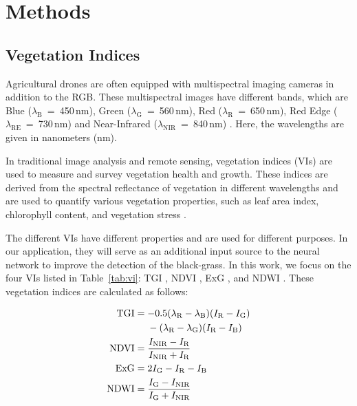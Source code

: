 \documentclass{ieeeaccess}
\begin{document}
\section{Methods}




\subsection{Vegetation Indices}\label{seq:VI}

Agricultural drones are often equipped with multispectral imaging cameras in addition to the RGB. These multispectral images have different bands, which are Blue ($\lambda_\text{B}$~=~450\,nm), Green ($\lambda_\text{G}$~=~560\,nm), Red ($\lambda_\text{R}$~=~650\,nm), Red Edge ($\lambda_\text{RE}$~=~730\,nm) and Near-Infrared ($\lambda_\text{NIR}$~=~840\,nm) \cite{von2015deploying}. Here, the wavelengths are given in nanometers (nm).

In traditional image analysis and remote sensing, vegetation indices (VIs) are used to measure and survey vegetation health and growth. These indices are derived from the spectral reflectance of vegetation in different wavelengths and are used to quantify various vegetation properties, such as leaf area index, chlorophyll content, and vegetation stress \cite{fang2008leaf}. 

The different VIs have different properties and are used for different purposes. In our application, they will serve as an additional input source to the neural network to improve the detection of the black-grass. In this work, we focus on the four VIs listed in Table~\ref{tab:vi}: TGI \cite{hunt2011remote}, NDVI \cite{pettorelli2013}, ExG \cite{woebbecke1995color}, and NDWI \cite{gao1996ndwi}. These vegetation indices are calculated as follows:

\begin{align}
\text{TGI} &= -0.5 (\lambda_\text{R} - \lambda_\text{B})(I_{\text{R}} - I_{\text{G}}) \notag \\
& \quad \ -(\lambda_\text{R} - \lambda_\text{G})(I_{\text{R}} - I_{\text{B}}) \\
\text{NDVI} &= \frac{I_{\text{NIR}} - I_{\text{R}}}{I_{\text{NIR}} + I_{\text{R}}} \\
\text{ExG} &= 2I_{\text{G}} - I_{\text{R}} - I_{\text{B}} \\
\text{NDWI} &= \frac{I_{\text{G}} - I_{\text{NIR}}}{I_{\text{G}} + I_{\text{NIR}}}
\end{align}
\end{document}
